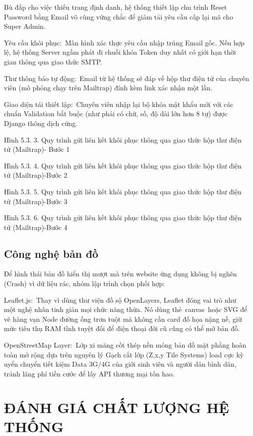 \documentclass[13pt,a4paper]{report}
\begin{document}
Bù đắp cho việc thiếu trang định danh, hệ thống thiết lập chu trình Reset Password bằng Email vô cùng vững chắc để giảm tải yêu cầu cấp lại mã cho Super Admin.

Yêu cầu khôi phục: Màn hình xác thực yêu cầu nhập trúng Email gốc. Nếu hợp lệ, hệ thống Server ngầm phát đi chuỗi khóa Token duy nhất có giới hạn thời gian thông qua giao thức SMTP.

Thư thông báo tự động: Email từ hệ thống sẽ đáp về hộp thư điện tử của chuyên viên (mô phỏng chạy trên Mailtrap) đính kèm link xác nhận một lần.

Giao diện tái thiết lập: Chuyên viên nhập lại bộ khóa mật khẩu mới với các chuẩn Validation bắt buộc (như phải có chữ, số, độ dài lớn hơn 8 tự) được Django thông dịch cứng.

Hình 5.3. 3. Quy trình gửi liên kết khôi phục thông qua giao thức hộp thư điện tử (Mailtrap)- Bước 1

Hình 5.3. 4. Quy trình gửi liên kết khôi phục thông qua giao thức hộp thư điện tử (Mailtrap)-Bước 2

Hình 5.3. 5. Quy trình gửi liên kết khôi phục thông qua giao thức hộp thư điện tử (Mailtrap)-Bước 3

Hình 5.3. 6. Quy trình gửi liên kết khôi phục thông qua giao thức hộp thư điện tử (Mailtrap)-Bước 4

\section{Công nghệ bản đồ}

Để hình thái bản đồ hiển thị mượt mà trên website ứng dụng không bị nghẽn (Crash) vì dữ liệu rác, nhóm lập trình chọn phối hợp:

Leaflet.js: Thay vì dùng thư viện đồ sộ OpenLayers, Leaflet đóng vai trò như một nghệ nhân tinh giản mọi chức năng thừa. Nó dùng thẻ canvas hoặc SVG để vẽ hàng vạn Node đường ống trơn tuột mà không cần card đồ họa nặng nề, giữ mức tiêu thụ RAM tĩnh tuyệt đối để điện thoại đời cũ cũng có thể mở bản đồ.

OpenStreetMap Layer: Lớp xi măng cốt thép nền móng bản đồ mặt phẳng hoàn toàn mở rộng dựa trên nguyên lý Gạch cắt lớp (Z,x,y Tile Systems) load cực kỳ uyển chuyển tiết kiệm Data 3G/4G của giới sinh viên và người dân bình dân, tránh lãng phí tiền cước để lấy API thương mại tốn hao.

\chapter{ĐÁNH GIÁ CHẤT LƯỢNG HỆ THỐNG}
\end{document}
